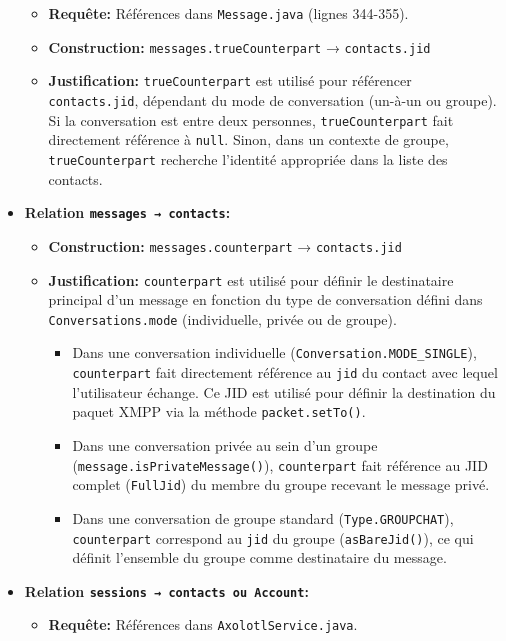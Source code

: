 \documentclass[a4paper,11pt]{article}
\begin{document}
\begin{itemize}
\begin{itemize}
        \item \textbf{Requête:} Références dans \texttt{Message.java} (lignes 344-355).
        \item \textbf{Construction:} \texttt{messages.trueCounterpart} → \texttt{contacts.jid}
        \item \textbf{Justification:} \texttt{trueCounterpart} est utilisé pour référencer \texttt{contacts.jid}, dépendant du mode de conversation (un-à-un ou groupe). Si la conversation est entre deux personnes, \texttt{trueCounterpart} fait directement référence à \texttt{null}. Sinon, dans un contexte de groupe, \texttt{trueCounterpart} recherche l'identité appropriée dans la liste des contacts.
    \end{itemize}
    \item \textbf{Relation \texttt{messages → contacts}:}
    \begin{itemize}
    \item \textbf{Construction:} \texttt{messages.counterpart} → \texttt{contacts.jid}
    \item \textbf{Justification:} \texttt{counterpart} est utilisé pour définir le destinataire principal d'un message en fonction du type de conversation défini dans \texttt{Conversations.mode} (individuelle, privée ou de groupe). 
    \begin{itemize}
        \item Dans une conversation individuelle (\texttt{Conversation.MODE\_SINGLE}), \texttt{counterpart} fait directement référence au \texttt{jid} du contact avec lequel l'utilisateur échange. Ce JID est utilisé pour définir la destination du paquet XMPP via la méthode \texttt{packet.setTo()}.
        \item Dans une conversation privée au sein d'un groupe (\texttt{message.isPrivateMessage()}), \texttt{counterpart} fait référence au JID complet (\texttt{FullJid}) du membre du groupe recevant le message privé.
        \item Dans une conversation de groupe standard (\texttt{Type.GROUPCHAT}), \texttt{counterpart} correspond au \texttt{jid} du groupe (\texttt{asBareJid()}), ce qui définit l'ensemble du groupe comme destinataire du message.
    \end{itemize}
        \end{itemize}
    \item \textbf{Relation \texttt{sessions → contacts ou Account}:}
    \begin{itemize}
        \item \textbf{Requête:} Références dans \texttt{AxolotlService.java}.

\end{itemize}
\end{itemize}
\end{document}
